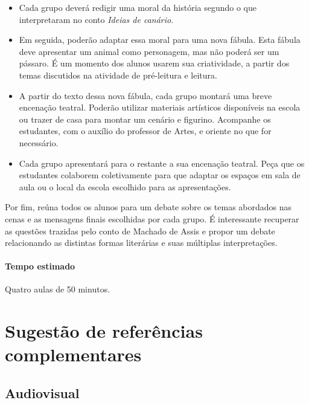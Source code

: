 \documentclass[11pt]{extarticle}
\begin{document}
\begin{itemize}

\item Cada grupo deverá redigir uma moral da história segundo o que interpretaram no conto \textit{Ideias de canário}.

\item Em seguida, poderão adaptar essa moral para uma nova fábula. Esta fábula deve apresentar um animal como personagem, mas não poderá ser um pássaro. É um momento dos alunos usarem sua criatividade, a partir dos temas discutidos na atividade de pré-leitura e leitura.

\item A partir do texto dessa nova fábula, cada grupo montará uma breve encenação teatral. Poderão utilizar materiais artísticos disponíveis na escola ou trazer de casa para montar um cenário e figurino. Acompanhe os estudantes, com o auxílio do professor de Artes, e oriente no que for necessário. 

\item Cada grupo apresentará para o restante a sua encenação teatral. Peça que os estudantes colaborem coletivamente para que adaptar os espaços em sala de aula ou o local da escola escolhido para as apresentações. 

\end{itemize}


Por fim, reúna todos os alunos para um debate sobre os temas abordados nas cenas e as mensagens finais escolhidas por cada grupo. É interessante recuperar as questões trazidas pelo conto de Machado de Assis e propor um debate relacionando as distintas formas literárias e suas múltiplas interpretações.

\paragraph{Tempo estimado} Quatro aulas de 50 minutos.

\section{Sugestão de referências complementares}

\subsection{Audiovisual}
\end{document}
